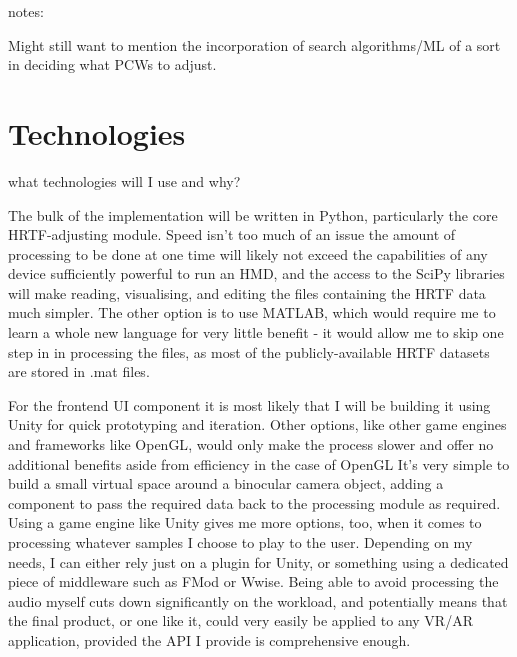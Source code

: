 \documentclass[10pt, oneside, a4paper, draft]{scrartcl}
\begin{document}
notes: 

Might still want to mention the incorporation of search algorithms/ML of a sort in deciding what PCWs to adjust.

\section*{Technologies}

what technologies will I use and why?

The bulk of the implementation will be written in Python, particularly the core HRTF-adjusting module. Speed isn't too much of an issue the amount of processing to be done at one time will likely not exceed the capabilities of any device sufficiently powerful to run an HMD, and the access to the SciPy libraries\cite{scipy website???} will make reading, visualising, and editing the files containing the HRTF data much simpler. The other option is to use MATLAB, which would require me to learn a whole new language for very little benefit - it would allow me to skip one step in in processing the files, as most of the publicly-available HRTF datasets are stored in .mat files.


For the frontend UI component it is most likely that I will be building it using Unity\cite{unity??} for quick prototyping and iteration. Other options, like other game engines and frameworks like OpenGL\cite{OpenGL??}, would only make the process slower and offer no additional benefits aside from efficiency in the case of OpenGL It's very simple to build a small virtual space around a binocular camera object, adding a component to pass the required data back to the processing module as required. Using a game engine like Unity gives me more options, too, when it comes to processing whatever samples I choose to play to the user. Depending on my needs, I can either rely just on a plugin for Unity, or something using a dedicated piece of middleware such as FMod or Wwise. Being able to avoid processing the audio myself cuts down significantly on the workload, and potentially means that the final product, or one like it, could very easily be applied to any VR/AR application, provided the API I provide is comprehensive enough. 
\end{document}
